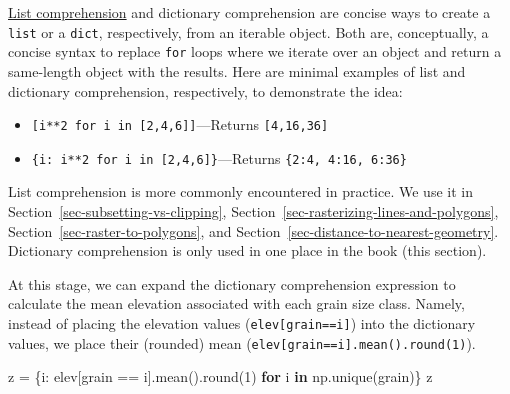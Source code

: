 \documentclass[
  letterpaper,
]{krantz}
\newenvironment{Shaded}{\begin{snugshade}}{\end{snugshade}}
\newcommand{\BuiltInTok}[1]{\textcolor[rgb]{0.00,0.23,0.31}{#1}}
\newcommand{\ControlFlowTok}[1]{\textcolor[rgb]{0.00,0.23,0.31}{\textbf{#1}}}
\newcommand{\DecValTok}[1]{\textcolor[rgb]{0.68,0.00,0.00}{#1}}
\newcommand{\KeywordTok}[1]{\textcolor[rgb]{0.00,0.23,0.31}{\textbf{#1}}}
\newcommand{\NormalTok}[1]{\textcolor[rgb]{0.00,0.23,0.31}{#1}}
\newcommand{\OperatorTok}[1]{\textcolor[rgb]{0.37,0.37,0.37}{#1}}
\providecommand{\tightlist}{%
  \setlength{\itemsep}{0pt}\setlength{\parskip}{0pt}}\usepackage{longtable,booktabs,array}
\begin{document}
\begin{tcolorbox}[enhanced jigsaw, title=\textcolor{quarto-callout-note-color}{\faInfo}\hspace{0.5em}{Note}, arc=.35mm, toprule=.15mm, titlerule=0mm, colframe=quarto-callout-note-color-frame, breakable, toptitle=1mm, bottomtitle=1mm, rightrule=.15mm, colbacktitle=quarto-callout-note-color!10!white, leftrule=.75mm, left=2mm, bottomrule=.15mm, opacityback=0, coltitle=black, opacitybacktitle=0.6, colback=white]

\href{https://docs.python.org/3/tutorial/datastructures.html\#list-comprehensions}{List
comprehension} and dictionary comprehension are concise ways to create a
\texttt{list} or a \texttt{dict}, respectively, from an iterable object.
Both are, conceptually, a concise syntax to replace \texttt{for} loops
where we iterate over an object and return a same-length object with the
results. Here are minimal examples of list and dictionary comprehension,
respectively, to demonstrate the idea:

\begin{itemize}
\tightlist
\item
  \texttt{{[}i**2\ for\ i\ in\ {[}2,4,6{]}{]}}---Returns
  \texttt{{[}4,16,36{]}}
\item
  \texttt{\{i:\ i**2\ for\ i\ in\ {[}2,4,6{]}\}}---Returns
  \texttt{\{2:4,\ 4:16,\ 6:36\}}
\end{itemize}

List comprehension is more commonly encountered in practice. We use it
in Section~\ref{sec-subsetting-vs-clipping},
Section~\ref{sec-rasterizing-lines-and-polygons},
Section~\ref{sec-raster-to-polygons}, and
Section~\ref{sec-distance-to-nearest-geometry}. Dictionary comprehension
is only used in one place in the book (this section).

\end{tcolorbox}

At this stage, we can expand the dictionary comprehension expression to
calculate the mean elevation associated with each grain size class.
Namely, instead of placing the elevation values
(\texttt{elev{[}grain==i{]}}) into the dictionary values, we place their
(rounded) mean (\texttt{elev{[}grain==i{]}.mean().round(1)}).

\begin{Shaded}
\begin{Highlighting}[]
\NormalTok{z }\OperatorTok{=}\NormalTok{ \{i: elev[grain }\OperatorTok{==}\NormalTok{ i].mean().}\BuiltInTok{round}\NormalTok{(}\DecValTok{1}\NormalTok{) }\ControlFlowTok{for}\NormalTok{ i }\KeywordTok{in}\NormalTok{ np.unique(grain)\}}
\NormalTok{z}
\end{Highlighting}
\end{Shaded}
\end{document}
